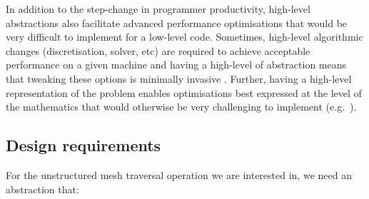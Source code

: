 \documentclass[thesis]{subfiles}
\begin{document}
In addition to the step-change in programmer productivity, high-level abstractions also facilitate advanced performance optimisations that would be very difficult to implement for a low-level code.
Sometimes, high-level algorithmic changes (discretisation, solver, etc) are required to achieve acceptable performance on a given machine and having a high-level of abstraction means that tweaking these options is minimally invasive \parencite{betteridgeCodeGenerationProductive2021}.
Further, having a high-level representation of the problem enables optimisations best expressed at the level of the mathematics that would otherwise be very challenging to implement (e.g.~\cite{homolyaExposingExploitingStructure2017}).

\cite{stroutSparsePolyhedralFramework2018} %
\cite{mirchandaneyPrinciplesRuntimeSupport1988} %
\cite{arenazInspectorExecutorAlgorithmIrregular2004} %

\subsection{Design requirements}

For the unstructured mesh traversal operation we are interested in, we need an abstraction that:
\end{document}
